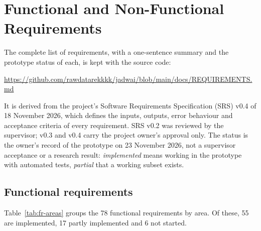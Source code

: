 \chapter{Functional and Non-Functional Requirements}\label{app:requirements}

The complete list of requirements, with a one-sentence summary and the prototype status of each, is kept with the source code:

\begin{center}
\url{https://github.com/rawdatarekkkk/jadwai/blob/main/docs/REQUIREMENTS.md}
\end{center}

It is derived from the project's Software Requirements Specification (SRS) v0.4 of 18 November 2026, which defines the inputs, outputs, error behaviour and acceptance criteria of every requirement. SRS v0.2 was reviewed by the supervisor; v0.3 and v0.4 carry the project owner's approval only. The status is the owner's record of the prototype on 23 November 2026, not a supervisor acceptance or a research result: \emph{implemented} means working in the prototype with automated tests, \emph{partial} that a working subset exists.

\section{Functional requirements}

Table~\ref{tab:fr-areas} groups the 78 functional requirements by area. Of these, 55 are implemented, 17 partly implemented and 6 not started.

